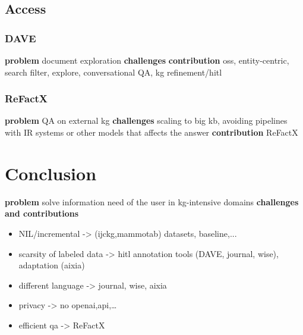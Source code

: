 \subsection{Access}

\subsubsection{DAVE}
\textbf{problem} document exploration
\textbf{challenges}
\textbf{contribution} oss, entity-centric, search filter, explore, conversational QA, kg refinement/hitl

\subsubsection{ReFactX}
\textbf{problem} QA on external kg
\textbf{challenges} scaling to big kb, avoiding pipelines with IR systems or other models that affects the answer
\textbf{contribution} ReFactX

\section{Conclusion}
\textbf{problem} solve information need of the user in kg-intensive domains
\textbf{challenges and contributions}
\begin{itemize}
    \item NIL/incremental -> (ijckg,mammotab) datasets, baseline,...
    \item scarsity of labeled data -> hitl annotation tools (DAVE, journal, wise), adaptation (aixia)
    \item different language -> journal, wise, aixia
    \item privacy -> no openai,api,\dots
    \item efficient qa -> ReFactX
\end{itemize}
 